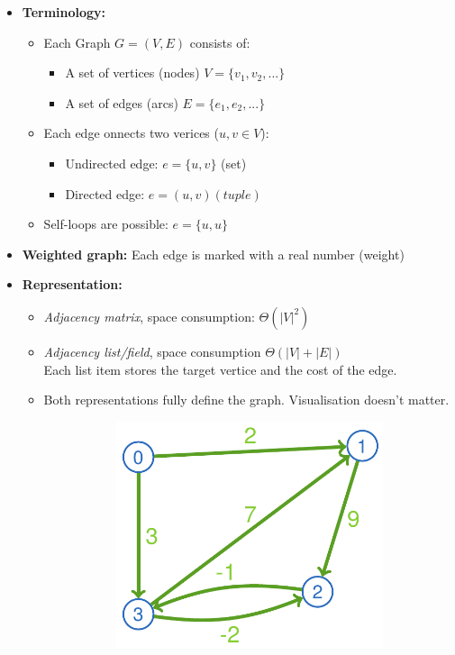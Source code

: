 \documentclass[12pt, a4paper]{scrartcl}
\begin{document}
\begin{itemize}
\item \textbf{Terminology:}
  \begin{itemize}
  \item Each Graph $G=(V,E)$ consists of:
    \begin{itemize}
    \item A set of vertices (nodes) $V=\{v_1,v_2,...\}$
    \item A set of edges (arcs) $E=\{e_1, e_2,...\}$
    \end{itemize}
  \item Each edge \cite{} onnects two verices ($u,v\in V$):
    \begin{itemize}
    \item Undirected edge: $e=\{u,v\}$ (set)
    \item Directed edge: $e=(u,v) (tuple)$
    \end{itemize}
  \item Self-loops are possible: $e=\{u,u\}$
  \end{itemize}
\item \textbf{Weighted graph:} Each edge is marked with a real number (weight)
\item \textbf{Representation:}
  \begin{itemize}
  \item \emph{Adjacency matrix}, space consumption: $\Theta(|V|^2)$
  \item \emph{Adjacency list/field}, space consumption $\Theta(|V|+|E|)$\\
    Each list item stores the target vertice and the cost of the edge.
  \item Both representations fully define the graph. Visualisation doesn't matter.
    \begin{figure}[htbp]
      \centering
      \begin{subfigure}[b]{.2\textwidth}
        \includegraphics[width=\textwidth]{example_graph}

\end{subfigure}
\end{figure}
\end{itemize}
\end{itemize}
\end{document}
